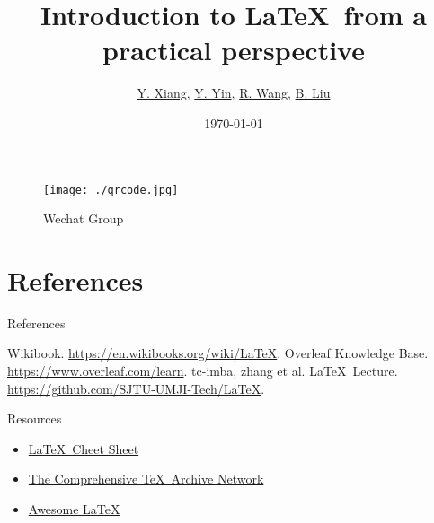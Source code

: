 \documentclass[aspectratio=169]{beamer}
\title{Introduction to \LaTeX\  from a practical perspective}
\author{\hyperlink{https://github.com/linsyking}{Y. Xiang}, \hyperlink{https://github.com/fakefred}{Y. Yin}, \hyperlink{https://github.com/Hydraallen}{R. Wang}, \hyperlink{https://github.com/keke1022}{B. Liu}}
\institute{TechJI}
\date{\today}
\begin{document}
\begin{frame}
    \titlepage
    \begin{figure}
        \centering
        \caption*{Wechat Group}
        \texttt{[image: ./qrcode.jpg]}
    \end{figure}
\end{frame}







\section*{References}

\begin{frame}{References}
    \begin{thebibliography}{9}
        Wikibook. \url{https://en.wikibooks.org/wiki/LaTeX}.
        Overleaf Knowledge Base. \url{https://www.overleaf.com/learn}.
        tc-imba, zhang et al. \LaTeX\ Lecture. \url{https://github.com/SJTU-UMJI-Tech/LaTeX}.
    \end{thebibliography}
\end{frame}

\begin{frame}{Resources}
    \begin{itemize}
        \item \href{https://wch.github.io/latexsheet/}{\LaTeX\  Cheet Sheet}
        \item \href{https://www.ctan.org/}{The Comprehensive \TeX\ Archive Network}
        \item \href{https://github.com/egeerardyn/awesome-LaTeX}{Awesome \LaTeX}
    \end{itemize}
\end{frame}
\end{document}
